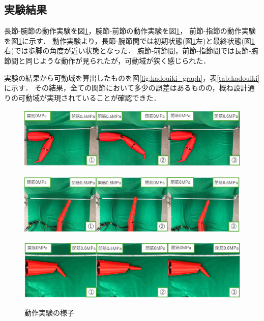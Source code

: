 \subsection{実験結果}
長節-腕節の動作実験を図\ref{fig:dousajikken}，腕節-前節の動作実験を図\ref{fig:dousajikken}，
前節-指節の動作実験を図\ref{fig:dousajikken}に示す．
動作実験より，長節-腕節間では初期状態(図\ref{fig:dousajikken}左)と最終状態(図\ref{fig:dousajikken}右)では歩脚の角度が近い状態となった．
腕節-前節間，前節-指節間では長節-腕節間と同じような動作が見られたが，可動域が狭く感じられた．


実験の結果から可動域を算出したものを図\ref{fig:kadouiki_graph}，表\ref{tab:kadouiki}に示す．
その結果，全ての関節において多少の誤差はあるものの，概ね設計通りの可動域が実現されていることが確認できた．
\begin{figure}[!ht]
    \begin{minipage}{1\hsize}
      \centering
      \includegraphics[scale=0.45]{image/chousetu-wansetu_edited.png}
      \vspace{-1mm}
      \label{fig:move_1}
    \end{minipage}
    \begin{minipage}{1\hsize}
      \centering
      \vspace{3mm}
      \includegraphics[scale=0.45]{image/wansetu-zensetu_edited.png}
      \label{fig:move_2}
    \end{minipage}
    \begin{minipage}{1\hsize}
      \centering
      \vspace{3mm}
      \includegraphics[scale=0.45]{image/zensetu-sisetu_edited.png}
      \label{fig:move_3}
    \end{minipage}
  \caption{動作実験の様子}
  \label{fig:dousajikken}
\end{figure}
